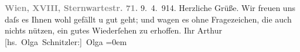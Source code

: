 \begin{ledgroupsized}[t]{13cm}
           \noindent{}\textcolor{gray}{\textbf{{\pb}Wien, XVIII, Sternwartestr. 71.}}\pend
           \pstart
           {\pb}9. 4. 914.\pend
           \pstart
           Herzliche Grüße. Wir freuen uns daſs es Ihnen wohl gefällt u gut geht; und wagen es
               ohne Fragezeichen, die auch nichts nützen, ein gutes Wiederſehen zu erhoffen.\pend
           \pstart
           Ihr \spacefill\mbox{Arthur}{\\[\baselineskip]}\spacefill\mbox{{[}hs. Olga Schnitzler:{]} Olga}\pend
           \leftskip=0em{}
         
         \endnumbering{}\end{ledgroupsized}  \newcommand{\dateiname}{L02174}\newcommand{\titel}{Arthur und Olga Schnitzler an Richard Beer-Hofmann, 9. 4. 1914}\newcommand{\editorInnen}{Martin Anton Müller und Gerd-Hermann Susen}
      